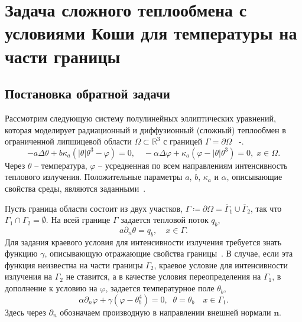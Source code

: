 \section{Задача сложного теплообмена с условиями Коши для температуры на части границы}
\label{sec:ch2/sec4}

\subsection{Постановка обратной задачи}\label{subsec:ch2/sec4/state}

Рассмотрим следующую систему полулинейных эллиптических уравнений, которая
моделирует радиационный и диффузионный (сложный) теплообмен в
ограниченной липшицевой области $\Omega\subset \mathbb{R}^3$ с границей
$\Gamma=\partial\Omega$ ~\cite{Pinnau2007}-\cite{Kovtanyuk2014a}.
\begin{equation}
    \label{eq:2_4:eq1}
    - a\Delta\theta + b\kappa_a(|\theta|\theta^3- \varphi)=0,   \quad
    -\alpha \Delta \varphi + \kappa_a(\varphi-|\theta|\theta^3)=0,\; x\in\Omega.
\end{equation}
Через $\theta$ -- температура,  $\varphi$ -- усредненная по всем
направлениям интенсивность теплового излучения.
Положительные параметры
$a$, $b$, $\kappa_a$ и $\alpha$, описывающие
свойства среды, являются заданными~\cite{Kovtanyuk2014a}.


Пусть граница области состоит из двух участков,
$\Gamma \coloneqq \partial \Omega =\overline{\Gamma}_1 \cup \overline{\Gamma}_2$,
так что $\Gamma_1 \cap \Gamma_2 =  \emptyset$.
На всей границе $\Gamma$ задается тепловой поток $q_b$,
\begin{equation}
    \label{eq:2_4:bc1}
    a\partial_n\theta = q_b, \quad x\in \Gamma.
\end{equation}
Для задания краевого условия для интенсивности излучения
требуется знать функцию $\gamma$, описывающую отражающие свойства границы~\cite{JVM-14}.
В случае, если эта функция неизвестна на части границы $\Gamma_2$,
краевое условие для интенсивности излучения на $\Gamma_2$ не ставится, а в качестве условия
переопределения на $\Gamma_1$, в дополнение к условию на
$\varphi$, задается температурное поле $\theta_b$,
\begin{equation}
    \label{eq:2_4:bc2}
    \alpha\partial_n\varphi + \gamma (\varphi - \theta_b ^4 ) = 0,\;\;
    \theta=\theta_b\quad x\in \Gamma_1.
\end{equation}
Здесь через $\partial_n$ обозначаем производную в направлении
внешней нормали $\mathbf n$.

